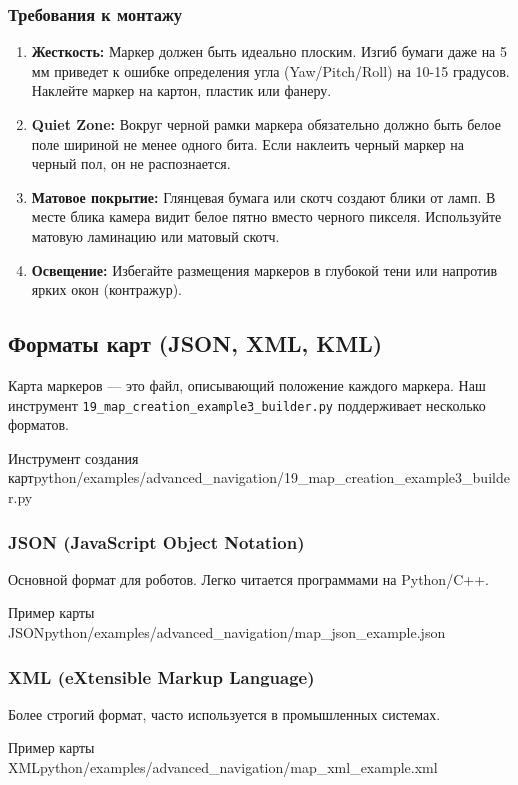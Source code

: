 \subsubsection{Требования к монтажу}
\begin{enumerate}
    \item \textbf{Жесткость:} Маркер должен быть идеально плоским. Изгиб бумаги даже на 5 мм приведет к ошибке определения угла (Yaw/Pitch/Roll) на 10-15 градусов. Наклейте маркер на картон, пластик или фанеру.
    \item \textbf{Quiet Zone:} Вокруг черной рамки маркера обязательно должно быть белое поле шириной не менее одного бита. Если наклеить черный маркер на черный пол, он не распознается.
    \item \textbf{Матовое покрытие:} Глянцевая бумага или скотч создают блики от ламп. В месте блика камера видит белое пятно вместо черного пикселя. Используйте матовую ламинацию или матовый скотч.
    \item \textbf{Освещение:} Избегайте размещения маркеров в глубокой тени или напротив ярких окон (контражур).
\end{enumerate}

\subsection{Форматы карт (JSON, XML, KML)}
Карта маркеров — это файл, описывающий положение каждого маркера. Наш инструмент \texttt{19\_map\_creation\_example3\_builder.py} поддерживает несколько форматов.

\begin{codefiletitle}[python]{Инструмент создания карт}{python/examples/advanced_navigation/19_map_creation_example3_builder.py}
\end{codefiletitle}

\subsubsection{JSON (JavaScript Object Notation)}
Основной формат для роботов. Легко читается программами на Python/C++.
\begin{codefiletitle}[python]{Пример карты JSON}{python/examples/advanced_navigation/map_json_example.json}
\end{codefiletitle}

\subsubsection{XML (eXtensible Markup Language)}
Более строгий формат, часто используется в промышленных системах.
\begin{codefiletitle}[xml]{Пример карты XML}{python/examples/advanced_navigation/map_xml_example.xml}
\end{codefiletitle}

